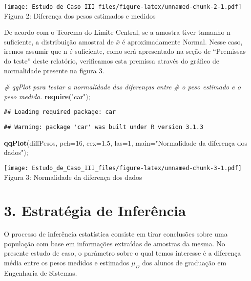 \documentclass[]{article}
\newenvironment{Shaded}{\begin{snugshade}}{\end{snugshade}}
\newcommand{\KeywordTok}[1]{\textcolor[rgb]{0.13,0.29,0.53}{\textbf{{#1}}}}
\newcommand{\DataTypeTok}[1]{\textcolor[rgb]{0.13,0.29,0.53}{{#1}}}
\newcommand{\DecValTok}[1]{\textcolor[rgb]{0.00,0.00,0.81}{{#1}}}
\newcommand{\FloatTok}[1]{\textcolor[rgb]{0.00,0.00,0.81}{{#1}}}
\newcommand{\StringTok}[1]{\textcolor[rgb]{0.31,0.60,0.02}{{#1}}}
\newcommand{\CommentTok}[1]{\textcolor[rgb]{0.56,0.35,0.01}{\textit{{#1}}}}
\newcommand{\NormalTok}[1]{{#1}}
\begin{document}
\texttt{[image: Estudo\_de\_Caso\_III\_files/figure-latex/unnamed-chunk-2-1.pdf]}
Figura 2: Diferença dos pesos estimados e medidos

\quad De acordo com o Teorema do Limite Central, se a amostra tiver
tamanho n suficiente, a distribuição amostral de $\bar{x}$ é
aproximadamente Normal. Nesse caso, iremos assumir que n é suficiente,
como será apresentado na seção de ``Premissas do teste'' deste
relatório, verificamos esta premissa através do gráfico de normalidade
presente na figura 3.

\begin{Shaded}
\begin{Highlighting}[]
\CommentTok{# qqPlot para testar a normalidade das diferenças entre}
\CommentTok{# o peso estimado e o peso medido.}
\KeywordTok{require}\NormalTok{(}\StringTok{"car"}\NormalTok{);}
\end{Highlighting}
\end{Shaded}

\begin{verbatim}
## Loading required package: car
\end{verbatim}

\begin{verbatim}
## Warning: package 'car' was built under R version 3.1.3
\end{verbatim}

\begin{Shaded}
\begin{Highlighting}[]
\KeywordTok{qqPlot}\NormalTok{(diffPesos, }\DataTypeTok{pch=}\DecValTok{16}\NormalTok{, }\DataTypeTok{cex=}\FloatTok{1.5}\NormalTok{, }\DataTypeTok{las=}\DecValTok{1}\NormalTok{, }\DataTypeTok{main=}\StringTok{"Normalidade da diferença dos dados"}\NormalTok{);}
\end{Highlighting}
\end{Shaded}

\texttt{[image: Estudo\_de\_Caso\_III\_files/figure-latex/unnamed-chunk-3-1.pdf]}
Figura 3: Normalidade da diferença dos dados

\section{3. Estratégia de Inferência}\label{estrategia-de-inferencia}

\quad O processo de inferência estatística consiste em tirar conclusões
sobre uma população com base em informações extraídas de amostras da
mesma. No presente estudo de caso, o parâmetro sobre o qual temos
interesse é a diferença média entre os pesos medidos e estimados
$\mu_{D}$ dos alunos de graduação em Engenharia de Sistemas.
\end{document}
